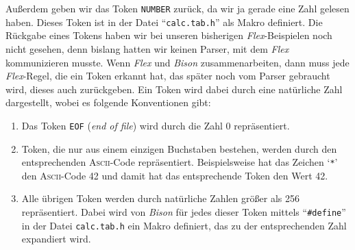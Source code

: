 \begin{enumerate}
      Au{\ss}erdem geben wir das Token \texttt{NUMBER} zur\"uck, da wir ja gerade eine Zahl
      gelesen haben.  Dieses Token ist in der Datei ``\texttt{calc.tab.h}'' als Makro
      definiert.  Die R\"uckgabe eines Tokens haben wir bei unseren bisherigen
      \textsl{Flex}-Beispielen noch nicht gesehen, denn bislang hatten wir keinen
      Parser, mit dem \textsl{Flex} kommunizieren musste.  Wenn \textsl{Flex} und
      \textsl{Bison} zusammenarbeiten, dann muss jede \textsl{Flex}-Regel, die ein
      Token erkannt hat, das sp\"ater noch vom Parser gebraucht wird, dieses auch
      zur\"uckgeben.  Ein Token wird dabei durch eine nat\"urliche Zahl dargestellt,
      wobei es folgende Konventionen gibt:
      \begin{enumerate}
      \item Das Token \texttt{EOF} (\emph{end of file}) wird durch die Zahl
            0 repr\"asentiert.
      \item Token, die nur aus einem einzigen Buchstaben bestehen, werden durch den
            entsprechenden \textsc{Ascii}-Code repr\"asentiert.  Beispielsweise hat
            das Zeichen `\texttt{*}' den \textsc{Ascii}-Code 42 und damit hat das
            entsprechende Token den Wert 42.
      \item Alle \"ubrigen Token werden durch nat\"urliche Zahlen gr\"o{\ss}er als 256
            repr\"asentiert.   Dabei wird von \textsl{Bison} f\"ur jedes dieser Token mittels
            ``\texttt{\#define}'' in der Datei \texttt{calc.tab.h} ein Makro definiert, 
            das zu der entsprechenden Zahl expandiert wird.
            

\end{enumerate}
\end{enumerate}
